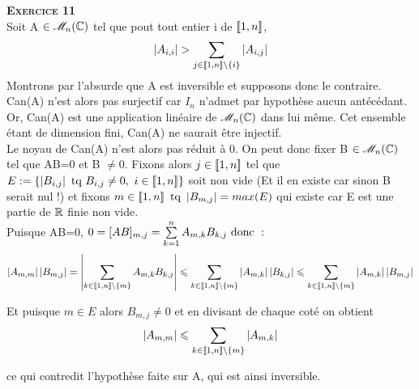 \documentclass[a4paper, 10pt]{article}
\newcommand{\sumkn}{\bigsum_{k=1}^{n}}
\newcommand{\intentp}[3]{\intent{#1}{#2}\backslash\lbrace{#3}\rbrace}
\begin{document}
\textsc{\bfseries\huge Exercice 11}\\

Soit A \(\in \mathscr{M}_{n}(\mathbb{C}) \) tel que pout tout entier i de \(\left[\!\left[1,n\right]\!\right]\),
\[ \card{A_{i,i}} > \bigsum_{j \in \intentp{1}{n}{i}} \card{A_{i,j}} \]
Montrons par l'absurde que A est inversible et supposons donc le contraire.\\ 

Can(A) n'est alors pas surjectif car \(I_{n}\) n'admet par hypothèse aucun antécédant. Or, Can(A) est une application linéaire de \(\mathscr{M}_{n}(\mathbb{C})\) dans lui même. Cet ensemble étant de dimension fini, Can(A) ne saurait être injectif.\\

Le noyau de Can(A) n'est alors pas réduit à 0. On peut donc fixer B \( \in \mathscr{M}_{n}(\mathbb{C})\) tel que AB=0 et B \(\ne 0\). Fixons alors \(j \in \left[\!\left[1,n\right]\!\right]\) tel que \(E := \left\{\left|B_{i,j}\right| \text{ tq } B_{i,j}\neq0,\ i \in \left[\!\left[1,n\right]\!\right]\right\}\)  soit non vide (Et il en existe car sinon B serait nul !) et fixons \(m \in\left[\!\left[1,n\right]\!\right] \text{ tq } \left|B_{m,j}\right|=max(E)\) qui existe car E est une partie de \(\mathbb{R}\) finie non vide.\\

Puisque AB=0, \(0=[AB]_{m,j}=\sumkn A_{m,k}B_{k,j} \donc : \) \[  \card{A_{m,m}}\card{B_{m,j}} = \card{\bigsum_{k \in \intentp{1}{n}{m} }A_{m,k}B_{k,j}} \leq\bigsum_{k \in \intentp{1}{n}{m} }\card{A_{m,k}}\card{B_{k,j}} \leq \bigsum_{k \in \intentp{1}{n}{m} }\card{A_{m,k}}\card{B_{m,j}} \] 

Et puisque \(m \in E\) alors \(B_{m,j} \ne 0\) et en divisant de chaque coté on obtient  \[\card{A_{m,m}} \leq \bigsum_{k \in \intentp{1}{n}{m} }\card{A_{m,k}}  \]

ce qui contredit l'hypothèse faite sur A, qui est ainsi inversible.
\end{document}
